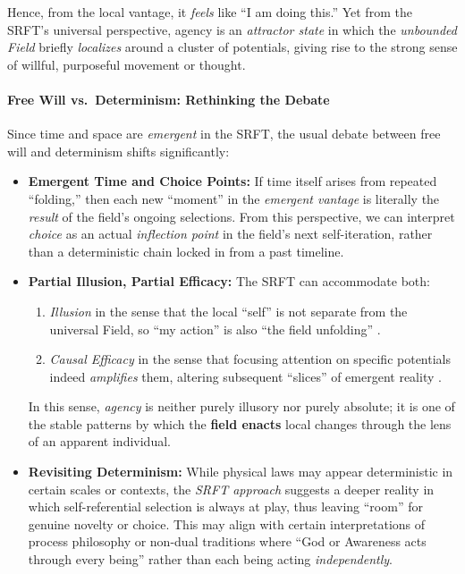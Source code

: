 \documentclass[12pt,a4paper]{article}
\begin{document}
\noindent
Hence, from the local vantage, it \emph{feels} like “I am doing this.” Yet from the
SRFT’s universal perspective, agency is an \emph{attractor state} in which the
\emph{unbounded Field} briefly \emph{localizes} around a cluster of potentials, giving
rise to the strong sense of willful, purposeful movement or thought.

\paragraph{Free Will vs.\ Determinism: Rethinking the Debate}
\label{subsec:freewill-debate}

Since time and space are \emph{emergent} in the SRFT, the usual debate between free will
and determinism shifts significantly:
\begin{itemize}
    \item \textbf{Emergent Time and Choice Points:} If time itself arises from repeated
    “folding,” then each new “moment” in the \emph{emergent vantage} is literally the
    \emph{result} of the field’s ongoing selections. From this perspective, we can
    interpret \emph{choice} as an actual \emph{inflection point} in the field’s next
    self-iteration, rather than a deterministic chain locked in from a past timeline.

    \item \textbf{Partial Illusion, Partial Efficacy:} The SRFT can accommodate both:
    \begin{enumerate}
        \item \emph{Illusion} in the sense that the local “self” is not separate from
        the universal Field, so “my action” is also “the field unfolding” \cite{wegner2002,metzinger2003subject}.
        \item \emph{Causal Efficacy} in the sense that focusing attention on specific
        potentials indeed \emph{amplifies} them, altering subsequent “slices” of
        emergent reality \cite{whitehead1929process}.
    \end{enumerate}
    In this sense, \emph{agency} is neither purely illusory nor purely absolute; it is
    one of the stable patterns by which the \textbf{field enacts} local changes through
    the lens of an apparent individual.

    \item \textbf{Revisiting Determinism:} While physical laws may appear deterministic
    in certain scales or contexts, the \emph{SRFT approach} suggests a deeper reality in
    which self-referential selection is always at play, thus leaving “room” for genuine
    novelty or choice. This may align with certain interpretations of process philosophy
    or non-dual traditions \cite{whitehead1929process} where “God or Awareness acts
    through every being” rather than each being acting \emph{independently}.
\end{itemize}
\end{document}
